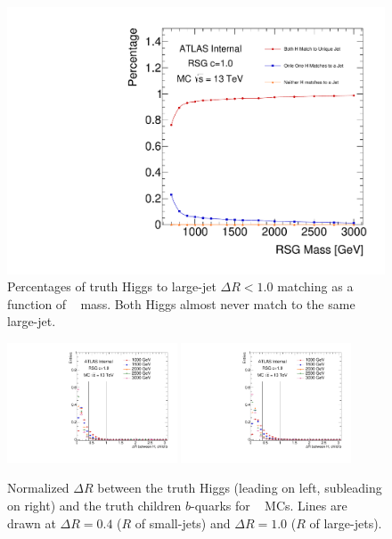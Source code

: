 \begin{figure}[htbp!]
	\begin{center}
	\includegraphics[scale=.45,angle=-90]{figures/boosted/Truth/truth_higgs-matching.pdf}
	\caption{Percentages of truth Higgs to large-\R jet $\Delta R<1.0$ matching as a function of \Grav~ mass. Both Higgs almost never match to the same large-\R jet.}
	\label{fig:truth-Higgs-largeRjet}
\end{center}
\end{figure}

\begin{figure}[htbp!]
\begin{center}
  \includegraphics[width=0.45\textwidth,angle=-90]{figures/boosted/Truth/truth_hbdR.pdf}
  \includegraphics[width=0.45\textwidth,angle=-90]{figures/boosted/Truth/truth_hbdR2.pdf}
\caption{Normalized $\Delta R$ between the truth Higgs (leading on left, subleading on right) and the truth children $b$-quarks for \Grav~ MCs. Lines are drawn at $\Delta R = 0.4$ ($R$ of small-\R jets) and $\Delta R = 1.0$ ($R$ of large-\R jets). }
\label{fig:truth-HbdR}
\end{center}
\end{figure}

